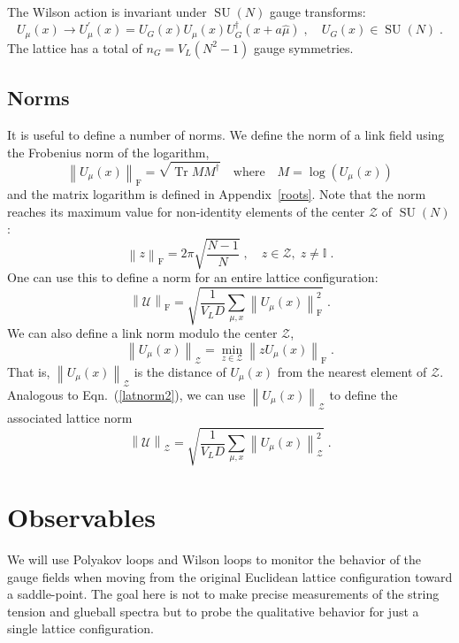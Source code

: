 \documentclass[preprint,aps,prd]{revtex4-2}
\newcommand{\da}{\dagger}  %
\newcommand{\be}{\begin{equation}}
\newcommand{\eq}{\end{equation}}
\newcommand{\zentrum}{\mathcal{Z}}       %
\newcommand{\config}{\mathcal{U}}
\DeclareMathOperator{\SU}{SU}
\DeclareMathOperator{\Tr}{Tr}
\newcommand\fnorm[1]{\left\lVert #1 \right\rVert_\mathrm{F}}
\newcommand\znorm[1]{\left\lVert #1 \right\rVert_\zentrum}
\begin{document}
The Wilson action is invariant under $\SU(N)$ gauge transforms:
%
\be
    U_\mu(x) \to U_\mu^\prime(x) = U_G(x) U_\mu(x) U_G^\da(x+a \hat{\mu})
         \; , \quad U_G(x) \in \SU(N) \; . \label{gauget}
\eq
%
The lattice has a total of $n_G = V_L\left(N^2-1\right)$ gauge symmetries.

\subsection{Norms}

It is useful to define a number of norms.  We define the norm
of a link field using the Frobenius norm of the logarithm,
%
\be
   \fnorm{U_\mu(x)} =
   \sqrt{\Tr M M^\dagger} \quad \mbox{where}
   \quad M = \log\left(U_\mu(x)\right)
   \label{sunorm}
\eq
and the matrix logarithm is defined in Appendix~\ref{roots}.
Note that the norm reaches its maximum value for non-identity
elements of the center $\zentrum$ of $\SU(N)$:
\be
    \fnorm{z} = 2\pi \sqrt{\frac{N-1}{N}} \; ,
     \quad z\in \zentrum,\; z\ne\mathbb{I} \; .
\eq
One can use this to define a norm for an entire
lattice configuration:
\be
   \fnorm{\config} =
   \sqrt{\frac{1}{V_L D} \sum_{\mu,x} \fnorm{U_\mu(x)}^2}
   \; . \label{latnorm2}
\eq
%
%
We can also define a link norm modulo the center $\zentrum$,
\be
  \znorm{U_\mu(x)} = \min_{z\in \zentrum} \fnorm{z U_\mu(x)} \; .
\eq
That is, $\znorm{U_\mu(x)}$ is the distance
of $U_\mu(x)$ from the nearest element of $\zentrum$.
Analogous to Eqn.~(\ref{latnorm2}), we can
use $\znorm{U_\mu(x)}$ to define the associated lattice norm
\be
    \znorm{\config} = \sqrt{\frac{1}{V_L D} \sum_{\mu,x}
  \znorm{U_\mu(x)}^2}
   \; . \label{latnormz}
\eq

\section{Observables}

We will use Polyakov loops and Wilson loops to monitor the
behavior of the gauge fields when moving from
the original Euclidean lattice configuration toward
a saddle-point.  The goal here is not to make precise
measurements of the string tension and glueball spectra
but to probe the qualitative behavior for just a single
lattice configuration.
\end{document}
